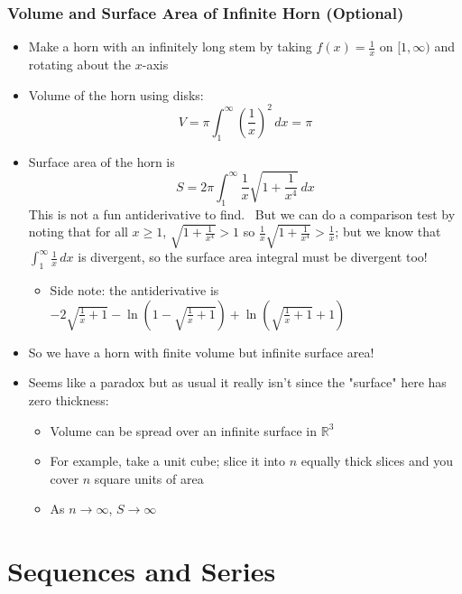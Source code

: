 \documentclass[letterpaper, 11pt, openany]{book}
\theoremstyle{mytheoremstyle}
\theoremstyle{myexamplestyle}
\begin{document}
\subsection{Volume and Surface Area of Infinite Horn (Optional)}
\begin{itemize}
    \item Make a horn with an infinitely long stem by taking $f(x) = \frac{1}{x}$ on $[1, \infty)$ and rotating about the $x$-axis
    \item Volume of the horn using disks:
    \[V = \pi \int_{1}^{\infty} \left( \frac{1}{x} \right)^{2} \, dx = \pi\]
    \item Surface area of the horn is
    \[S = 2\pi \int_{1}^{\infty} \frac{1}{x} \sqrt{1 + \frac{1}{x^{4}}}\, dx    \]
    This is not a fun antiderivative to find. \faFrown \ But we can do a comparison test by noting that for all $x \geq 1$, $\sqrt{1 + \frac{1}{x^{4}}} > 1$ so $\frac{1}{x} \sqrt{1 + \frac{1}{x^{4}}} > \frac{1}{x}$; but we know that $\displaystyle \int_{1}^{\infty} \frac{1}{x}\, dx$ is divergent, so the surface area integral must be divergent too!
    \begin{itemize}
        \item Side note: the antiderivative is $-2 \sqrt{\frac{1}{x}+1}-\ln \left(1-\sqrt{\frac{1}{x}+1}\right)+\ln
        \left(\sqrt{\frac{1}{x}+1}+1\right)$ \faMeh
    \end{itemize}
    \item So we have a horn with finite volume but infinite surface area!
    \item Seems like a paradox but as usual it really isn't since the "surface" here has zero thickness:
    \begin{itemize}
        \item Volume can be spread over an infinite surface in $\mathbb{R}^{3}$
        \item For example, take a unit cube; slice it into $n$ equally thick slices and you cover $n$ square units of area
        \item As $n \to \infty$, $S \to \infty$
    \end{itemize}
\end{itemize}


\newpage\thispagestyle{firstofchapter}
\chapter{Sequences and Series}
\setcounter{figure}{0}
\end{document}
